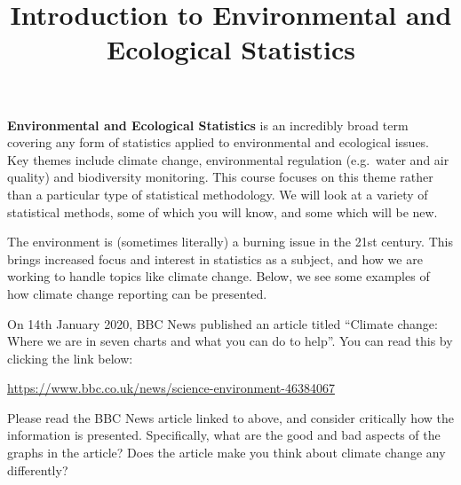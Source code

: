 \documentclass[
  letterpaper,
  DIV=11,
  numbers=noendperiod]{scrartcl}
\title{Introduction to Environmental and Ecological Statistics}
\author{}
\date{}
\makeatletter
\renewcommand{\maketitle}{\bgroup\setlength{\parindent}{0pt}
\begin{flushleft}
  {\color{uniblue}\sffamily\huge\textbf{\@title}} \vspace{0.3cm} \newline
  {\Large {\@subtitle}} \newline
  \@author
\end{flushleft}\egroup
}
\makeatother
\begin{document}
\maketitle

\pagestyle{mystyle}

\textbf{Environmental and Ecological Statistics} is an incredibly broad
term covering any form of statistics applied to environmental and
ecological issues. Key themes include climate change, environmental
regulation (e.g.~water and air quality) and biodiversity monitoring.
This course focuses on this theme rather than a particular type of
statistical methodology. We will look at a variety of statistical
methods, some of which you will know, and some which will be new.

The environment is (sometimes literally) a burning issue in the 21st
century. This brings increased focus and interest in statistics as a
subject, and how we are working to handle topics like climate change.
Below, we see some examples of how climate change reporting can be
presented.

\begin{tcolorbox}[enhanced jigsaw, breakable, bottomrule=.15mm, toprule=.15mm, colbacktitle=quarto-callout-note-color!10!white, bottomtitle=1mm, arc=.35mm, opacitybacktitle=0.6, titlerule=0mm, colframe=quarto-callout-note-color-frame, toptitle=1mm, title={BBC News article on climate change}, rightrule=.15mm, leftrule=.75mm, left=2mm, colback=white, opacityback=0, coltitle=black]

On 14th January 2020, BBC News published an article titled ``Climate
change: Where we are in seven charts and what you can do to help''. You
can read this by clicking the link below:

\url{https://www.bbc.co.uk/news/science-environment-46384067}

\end{tcolorbox}

\begin{tcolorbox}[enhanced jigsaw, breakable, bottomrule=.15mm, toprule=.15mm, colbacktitle=quarto-callout-tip-color!10!white, bottomtitle=1mm, arc=.35mm, opacitybacktitle=0.6, titlerule=0mm, colframe=quarto-callout-tip-color-frame, toptitle=1mm, title={Exercise 1}, rightrule=.15mm, leftrule=.75mm, left=2mm, colback=white, opacityback=0, coltitle=black]

Please read the BBC News article linked to above, and consider
critically how the information is presented. Specifically, what are the
good and bad aspects of the graphs in the article? Does the article make
you think about climate change any differently?

\end{tcolorbox}
\end{document}
